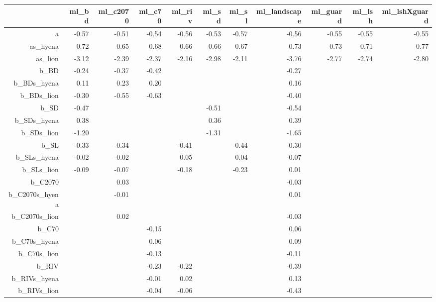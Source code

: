 \begin{table}[ht]
\centering
\begin{tabular}{rrrrrrrrrrr}
  \hline
 & ml\_bd & ml\_c2070 & ml\_c70 & ml\_riv & ml\_sd & ml\_sl & ml\_landscape & ml\_guard & ml\_lsh & ml\_lshXguard \\ 
  \hline
a & -0.57 & -0.51 & -0.54 & -0.56 & -0.53 & -0.57 & -0.56 & -0.55 & -0.55 & -0.55 \\ 
  as\_hyena & 0.72 & 0.65 & 0.68 & 0.66 & 0.66 & 0.67 & 0.73 & 0.73 & 0.71 & 0.77 \\ 
  as\_lion & -3.12 & -2.39 & -2.37 & -2.16 & -2.98 & -2.11 & -3.76 & -2.77 & -2.74 & -2.80 \\ 
  b\_BD & -0.24 & -0.37 & -0.42 &  &  &  & -0.27 &  &  &  \\ 
  b\_BDs\_hyena & 0.11 & 0.23 & 0.20 &  &  &  & 0.16 &  &  &  \\ 
  b\_BDs\_lion & -0.30 & -0.55 & -0.63 &  &  &  & -0.40 &  &  &  \\ 
  b\_SD & -0.47 &  &  &  & -0.51 &  & -0.54 &  &  &  \\ 
  b\_SDs\_hyena & 0.38 &  &  &  & 0.36 &  & 0.39 &  &  &  \\ 
  b\_SDs\_lion & -1.20 &  &  &  & -1.31 &  & -1.65 &  &  &  \\ 
  b\_SL & -0.33 & -0.34 &  & -0.41 &  & -0.44 & -0.30 &  &  &  \\ 
  b\_SLs\_hyena & -0.02 & -0.02 &  & 0.05 &  & 0.04 & -0.07 &  &  &  \\ 
  b\_SLs\_lion & -0.09 & -0.07 &  & -0.18 &  & -0.23 & 0.01 &  &  &  \\ 
  b\_C2070 &  & 0.03 &  &  &  &  & -0.03 &  &  &  \\ 
  b\_C2070s\_hyena &  & -0.01 &  &  &  &  & 0.01 &  &  &  \\ 
  b\_C2070s\_lion &  & 0.02 &  &  &  &  & -0.03 &  &  &  \\ 
  b\_C70 &  &  & -0.15 &  &  &  & 0.06 &  &  &  \\ 
  b\_C70s\_hyena &  &  & 0.06 &  &  &  & 0.09 &  &  &  \\ 
  b\_C70s\_lion &  &  & -0.13 &  &  &  & -0.11 &  &  &  \\ 
  b\_RIV &  &  & -0.23 & -0.22 &  &  & -0.39 &  &  &  \\ 
  b\_RIVs\_hyena &  &  & -0.01 & 0.02 &  &  & 0.13 &  &  &  \\ 
  b\_RIVs\_lion &  &  & -0.04 & -0.06 &  &  & -0.43 &  &  &  \\ 

\end{tabular}
\end{table}
